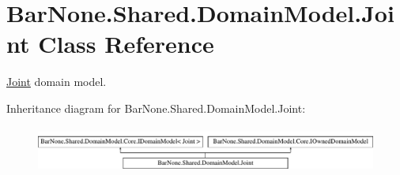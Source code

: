 \hypertarget{class_bar_none_1_1_shared_1_1_domain_model_1_1_joint}{}\section{Bar\+None.\+Shared.\+Domain\+Model.\+Joint Class Reference}
\label{class_bar_none_1_1_shared_1_1_domain_model_1_1_joint}


\mbox{\hyperlink{class_bar_none_1_1_shared_1_1_domain_model_1_1_joint}{Joint}} domain model.  


Inheritance diagram for Bar\+None.\+Shared.\+Domain\+Model.\+Joint\+:\begin{figure}[H]
\begin{center}
\leavevmode
\includegraphics[height=1.542700cm]{class_bar_none_1_1_shared_1_1_domain_model_1_1_joint}
\end{center}
\end{figure}
